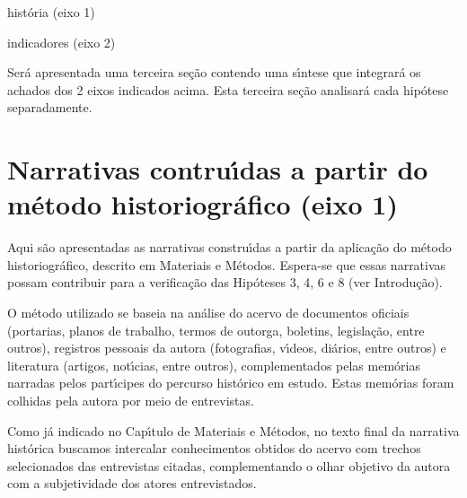 \documentclass[
12pt,		%
openright,	%
twoside,  %
a4paper,			%
chapter=TITLE,		%
english,			%
french,				%
spanish,			%
brazil				%
]{USPSC-classe/USPSC}
\begin{document}
\begin{alineas}
\item hist\'oria (eixo 1)
\item indicadores (eixo 2)
\end{alineas}

Ser\'a apresentada uma terceira se\c{c}\~ao contendo uma s\'{\i}ntese que integrar\'a os achados dos 2 eixos indicados acima. Esta terceira se\c{c}\~ao analisar\'a cada hip\'otese separadamente.










\section[Narrativas contru\'{\i}das a partir do m\'etodo historiogr\'afico (eixo 1)]{Narrativas contru\'{\i}das a partir do m\'etodo historiogr\'afico (eixo 1)}\label{Narrativas contru\'{\i}das a partir do m\'etodo historiogr\'afico (eixo 1)}
Aqui s\~ao apresentadas as narrativas constru\'{\i}das a partir da aplica\c{c}\~ao do m\'etodo historiogr\'afico, descrito em Materiais e M\'etodos. Espera-se que essas narrativas possam contribuir para a verifica\c{c}\~ao das Hip\'oteses 3, 4, 6 e 8 (ver Introdu\c{c}\~ao).










O m\'etodo utilizado se baseia na an\'alise do acervo de documentos oficiais (portarias, planos de trabalho, termos de outorga, boletins, legisla\c{c}\~ao, entre outros), registros pessoais da autora (fotografias, v\'{\i}deos, di\'arios, entre outros) e literatura (artigos, not\'{\i}cias, entre outros), complementados pelas mem\'orias narradas pelos part\'{\i}cipes do percurso hist\'orico em estudo. Estas mem\'orias foram colhidas pela autora por meio de entrevistas.










Como j\'a indicado no Cap\'{\i}tulo de Materiais e M\'etodos, no texto final da narrativa hist\'orica buscamos intercalar conhecimentos obtidos do acervo com trechos selecionados das entrevistas citadas, complementando o olhar objetivo da autora com a subjetividade dos atores entrevistados.
\end{document}
